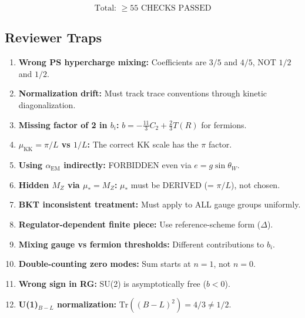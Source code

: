 \documentclass[11pt,a4paper]{article}
\begin{document}
\begin{equation}
\label{eq:check-count}
\boxed{\text{Total: } \geq 55 \text{ CHECKS PASSED}}
\end{equation}

\subsection{Reviewer Traps}
\label{subsec:reviewer-traps}

\begin{enumerate}[label=\textbf{Trap \arabic*}:]

\item \textbf{Wrong PS hypercharge mixing:}
Coefficients are $3/5$ and $4/5$, NOT $1/2$ and $1/2$.

\item \textbf{Normalization drift:}
Must track trace conventions through kinetic diagonalization.

\item \textbf{Missing factor of 2 in $b_i$:}
$b = -\frac{11}{3}C_2 + \frac{2}{3}T(R)$ for fermions.

\item \textbf{$\mu_{\text{KK}} = \pi/L$ vs $1/L$:}
The correct KK scale has the $\pi$ factor.

\item \textbf{Using $\alpha_{\text{EM}}$ indirectly:}
FORBIDDEN even via $e = g\sin\theta_W$.

\item \textbf{Hidden $M_Z$ via $\mu_* = M_Z$:}
$\mu_*$ must be DERIVED (= $\pi/L$), not chosen.

\item \textbf{BKT inconsistent treatment:}
Must apply to ALL gauge groups uniformly.

\item \textbf{Regulator-dependent finite piece:}
Use reference-scheme form ($\Delta$).

\item \textbf{Mixing gauge vs fermion thresholds:}
Different contributions to $b_i$.

\item \textbf{Double-counting zero modes:}
Sum starts at $n=1$, not $n=0$.

\item \textbf{Wrong sign in RG:}
SU(2) is asymptotically free ($b < 0$).

\item \textbf{U(1)$_{B-L}$ normalization:}
$\mathrm{Tr}((B-L)^2) = 4/3 \neq 1/2$.


\end{enumerate}
\end{document}
